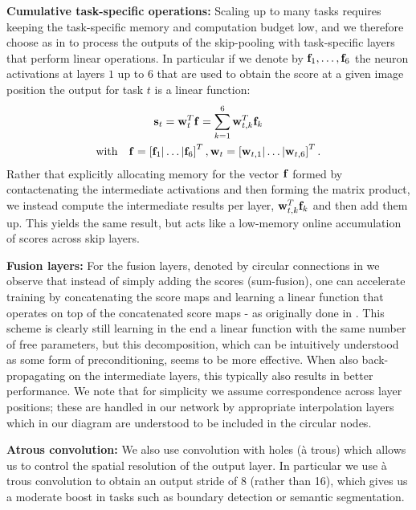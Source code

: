 \documentclass[10pt,twocolumn,letterpaper]{article}
\begin{document}
{\textbf{Cumulative task-specific operations:}}
Scaling up to many tasks requires  keeping the task-specific memory  and computation budget low, and we therefore choose as in  \cite{hed,iclr16} to process the outputs of the skip-pooling with task-specific layers that perform linear operations.   In particular if we denote by
 $\mathbf{f}_1,\ldots,\mathbf{f}_6$ the  neuron activations at layers $1$ up to $6$ that are used to obtain the score at a given image position 
  the output for task $t$ is a linear function:
 \begin{gather}
 \mathbf{s}_t = \mathbf{w}^T_t \mathbf{f}  = \sum_{k=1}^{6} \mathbf{w}^T_{t,k} \mathbf{f}_k \\
 \mathrm{with}\quad \mathbf{f} =
 \left[\mathbf{f}_1 |	  \hdots | \mathbf{f}_6 \right]^T, \mathbf{w}_t = \left[
 \mathbf{w}_{t,1} |
 \hdots | \mathbf{w}_{t,6}
 \right]^T.
 	 \end{gather}	 
 	Rather that explicitly allocating memory for the vector $\mathbf{f}$ formed by contactenating the intermediate activations and then forming the matrix product,
 	we instead compute the intermediate results per layer, $\mathbf{w}^T_{t,k} \mathbf{f}_k$ and then add them up. This  yields the same result, but acts like a low-memory  online accumulation of scores across skip layers. 
 	
 	{\textbf{Fusion layers:}}
 	For the fusion layers, denoted by circular connections in  we observe that instead of simply adding the scores (sum-fusion), one can  accelerate training by concatenating {{the score maps}} and learning a linear function that operates on top of the concatenated score maps - as originally done in \cite{hed}. This scheme is clearly still learning in the end a linear function with the same number of free parameters, but this decomposition, which can be intuitively understood as some form of preconditioning, seems to be more effective. When also back-propagating on the intermediate layers, this typically also results in better performance.  We note that for simplicity we  assume   correspondence across layer positions; these are handled in our network by appropriate interpolation layers which in our diagram are understood to be included in the circular nodes. 
 	
\textbf{{Atrous convolution:}}
We also use {{convolution with holes}} (\`a trous) \cite{PapandreouKS15,ChenPK0Y16} which allows us to control the spatial resolution of the output layer. In particular we use \`a trous convolution to obtain an output stride of 8 (rather than 16), which gives us a moderate boost in tasks such as boundary detection or semantic segmentation. 
 	
\end{document}
